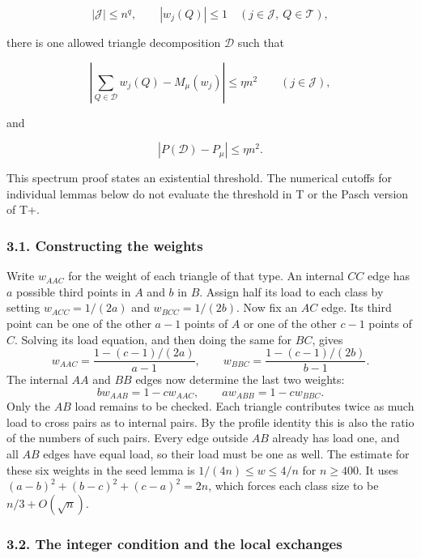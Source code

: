 \documentclass[english,11pt,a4paper]{article}
\begin{document}
\[|\mathcal J|\leq n^q,
\qquad |w_j(Q)|\leq1\quad(j\in\mathcal J,\ Q\in\mathcal T),          \tag{2.9}\]

there is one allowed triangle decomposition \(\mathcal D\) such that

\[\left|\sum_{Q\in\mathcal D}w_j(Q)-M_\mu(w_j)\right|
\leq\eta n^2\qquad(j\in\mathcal J),                                \tag{2.10}\]

and

\[|P(\mathcal D)-P_\mu|\leq\eta n^2.                                \tag{2.11}\]

This spectrum proof states an existential threshold. The numerical cutoffs for individual lemmas below do not evaluate the threshold in T or the Pasch version of T+.

\subsubsection{3.1. Constructing the weights}\label{constructing-the-weights}

Write \(w_{AAC}\) for the weight of each triangle of that type. An internal \(CC\) edge has \(a\) possible third points in \(A\) and \(b\) in \(B\). Assign half its load to each class by setting \(w_{ACC}=1/(2a)\) and \(w_{BCC}=1/(2b)\). Now fix an \(AC\) edge. Its third point can be one of the other \(a-1\) points of \(A\) or one of the other \(c-1\) points of \(C\). Solving its load equation, and then doing the same for \(BC\), gives \[w_{AAC}=\frac{1-(c-1)/(2a)}{a-1},\qquad
w_{BBC}=\frac{1-(c-1)/(2b)}{b-1}.\] The internal \(AA\) and \(BB\) edges now determine the last two weights: \[b w_{AAB}=1-cw_{AAC},\qquad a w_{ABB}=1-cw_{BBC}.\] Only the \(AB\) load remains to be checked. Each triangle contributes twice as much load to cross pairs as to internal pairs. By the profile identity this is also the ratio of the numbers of such pairs. Every edge outside \(AB\) already has load one, and all \(AB\) edges have equal load, so their load must be one as well. The estimate for these six weights in the seed lemma is \(1/(4n)\le w\le4/n\) for \(n\ge400\). It uses \((a-b)^2+(b-c)^2+(c-a)^2=2n\), which forces each class size to be \(n/3+O(\sqrt n)\).

\subsubsection{3.2. The integer condition and the local exchanges}\label{the-integer-condition-and-the-local-exchanges}
\end{document}
